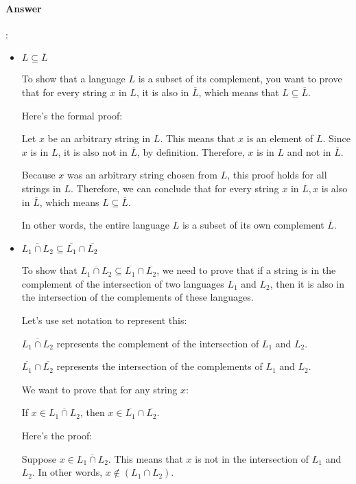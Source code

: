 \documentclass{article}
\begin{document}
\paragraph{Answer}:


\begin{itemize}
  \item $L \subseteq \overline{L}$
  
  To show that a language $L$ is a subset of its complement, you want to prove that for every string $x$ in $L$, it is also in $\overline{L}$, which means that $L \subseteq \overline{L}$.

  Here's the formal proof:

  Let $x$ be an arbitrary string in $L$. This means that $x$ is an element of $L$. Since $x$ is in $L$, it is also not in $\overline{L}$, by definition. Therefore, $x$ is in $L$ and not in $\overline{L}$.

  Because $x$ was an arbitrary string chosen from $L$, this proof holds for all strings in $L$. Therefore, we can conclude that for every string $x$ in $L, x$ is also in $\overline{L}$, which means $L \subseteq \overline{L}$.

  In other words, the entire language $L$ is a subset of its own complement $\overline{L}$.

  \item $\overline{ L_1 \cap L_2 } \subseteq \overline{L_1} \cap \overline{L_2}$
  
  To show that $\overline{L_1 \cap L_2} \subseteq \overline{L_1} \cap \overline{L_2}$, we need to prove that if a string is in the complement of the intersection of two languages $L_1$ and $L_2$, then it is also in the intersection of the complements of these languages.

  Let's use set notation to represent this:
  
  $\overline{L_1 \cap L_2}$ represents the complement of the intersection of $L_1$ and $L_2$.
  
  $\overline{L_1} \cap \overline{L_2}$ represents the intersection of the complements of $L_1$ and $L_2$.
  
  We want to prove that for any string $x$:
  
  If $x \in \overline{L_1 \cap L_2}$, then $x \in \overline{L_1} \cap \overline{L_2}$.
  
  Here's the proof:
  
  Suppose $x \in \overline{L_1 \cap L_2}$. This means that $x$ is not in the intersection of $L_1$ and $L_2$. In other words, $x \notin (L_1 \cap L_2)$.
  

\end{itemize}
\end{document}
